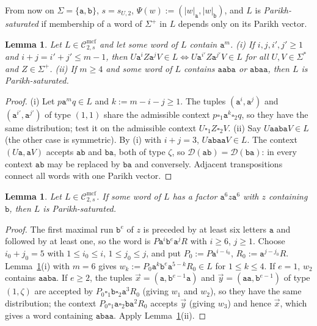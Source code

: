 \documentclass[11pt]{article}
\numberwithin{equation}{section}
\theoremstyle{plain}
\newtheorem{lemma}[theorem]{Lemma}
\theoremstyle{definition}
\theoremstyle{remark}
\newcommand{\Cmcf}[2]{\mathcal{C}^{\mathrm{mcf}}_{#1,#2}}
\newcommand{\D}{\mathcal{D}}
\newcommand{\tuple}[1]{\vec{#1}}
\newcommand{\blank}{\square}
\begin{document}
From now on $\Sigma=\{\mathtt a,\mathtt b\}$, $s=s_{U,2}$, $\Psi(w):=(|w|_{\mathtt a},|w|_{\mathtt b})$,
and $L$ is \emph{Parikh-saturated} if membership of a word of $\Sigma^+$ in $L$
depends only on its Parikh vector.

\begin{lemma}\label{lem:app-u1-transfer}
Let $L\in\Cmcf{2}{s}$ and let some word of $L$ contain $\mathtt a^m$.
\textup{(i)} If $i,j,i',j'\ge1$ and $i+j=i'+j'\le m-1$, then
$U\mathtt a^iZ\mathtt a^jV\in L\iff U\mathtt a^{i'}Z\mathtt a^{j'}V\in L$ for all
$U,V\in\Sigma^*$ and $Z\in\Sigma^+$.
\textup{(ii)} If $m\ge4$ and some word of $L$ contains $\mathtt a\mathtt a\mathtt b\mathtt a$
or $\mathtt a\mathtt b\mathtt a\mathtt a$, then $L$ is Parikh-saturated.
\end{lemma}

\begin{proof}
(i) Let $p\mathtt a^mq\in L$ and $k:=m-i-j\ge1$.  The tuples $(\mathtt a^i,\mathtt a^j)$ and
$(\mathtt a^{i'},\mathtt a^{j'})$ of type $(1,1)$ share the admissible context
$p\blank_1\mathtt a^k\blank_2q$, so they have the same distribution; test it on the
admissible context $U\blank_1Z\blank_2V$.
(ii) Say $U\mathtt a\mathtt a\mathtt b\mathtt a V\in L$ (the other case is symmetric).  By (i)
with $i+j=3$, $U\mathtt a\mathtt b\mathtt a\mathtt aV\in L$.  The context $(U\mathtt a,\mathtt aV)$
accepts $\mathtt{ab}$ and $\mathtt{ba}$, both of type $\zeta$, so
$\D(\mathtt{ab})=\D(\mathtt{ba})$: in every context $\mathtt{ab}$ may be replaced by
$\mathtt{ba}$ and conversely.  Adjacent transpositions connect all words with one
Parikh vector.
\end{proof}

\begin{lemma}\label{lem:app-u1-deep}
Let $L\in\Cmcf{2}{s}$.  If some word of $L$ has a factor $\mathtt a^6z\mathtt a^6$ with $z$
containing $\mathtt b$, then $L$ is Parikh-saturated.
\end{lemma}

\begin{proof}
The first maximal run $\mathtt b^e$ of $z$ is preceded by at least six letters
$\mathtt a$ and followed by at least one, so the word is
$P\mathtt a^i\mathtt b^e\mathtt a^jR$ with $i\ge6$, $j\ge1$.  Choose $i_0+j_0=5$ with
$1\le i_0\le i$, $1\le j_0\le j$, and put $P_0:=P\mathtt a^{i-i_0}$,
$R_0:=\mathtt a^{j-j_0}R$.  Lemma~\ref{lem:app-u1-transfer}(i) with $m=6$ gives
$w_k:=P_0\mathtt a^k\mathtt b^e\mathtt a^{5-k}R_0\in L$ for $1\le k\le4$.  If $e=1$, $w_2$
contains $\mathtt{aaba}$.  If $e\ge2$, the tuples $\tuple x=(\mathtt a,\mathtt b^{e-1}\mathtt a)$
and $\tuple y=(\mathtt a\mathtt a,\mathtt b^{e-1})$ of type $(1,\zeta)$ are accepted by
$P_0\blank_1\mathtt b\blank_2\mathtt a^3R_0$ (giving $w_1$ and $w_2$), so they have the
same distribution; the context $P_0\blank_1\mathtt a\blank_2\mathtt b\mathtt a^2R_0$ accepts
$\tuple y$ (giving $w_3$) and hence $\tuple x$, which gives a word containing
$\mathtt{abaa}$.  Apply Lemma~\ref{lem:app-u1-transfer}(ii).
\end{proof}
\end{document}
